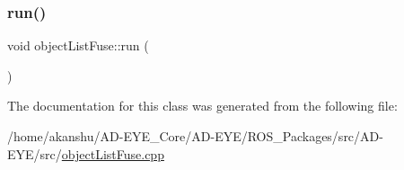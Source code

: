 \mbox{\label{classobjectListFuse_aa72f1c29c314488e93512d3264dc9b0e}} 
\subsubsection{\texorpdfstring{run()}{run()}}
{\footnotesize\ttfamily void object\+List\+Fuse\+::run (\begin{DoxyParamCaption}{ }\end{DoxyParamCaption})\hspace{0.3cm}{\ttfamily [inline]}}



The documentation for this class was generated from the following file\+:\begin{DoxyCompactItemize}
\item 
/home/akanshu/\+A\+D-\/\+E\+Y\+E\+\_\+\+Core/\+A\+D-\/\+E\+Y\+E/\+R\+O\+S\+\_\+\+Packages/src/\+A\+D-\/\+E\+Y\+E/src/\hyperlink{objectListFuse_8cpp}{object\+List\+Fuse.\+cpp}\end{DoxyCompactItemize}
